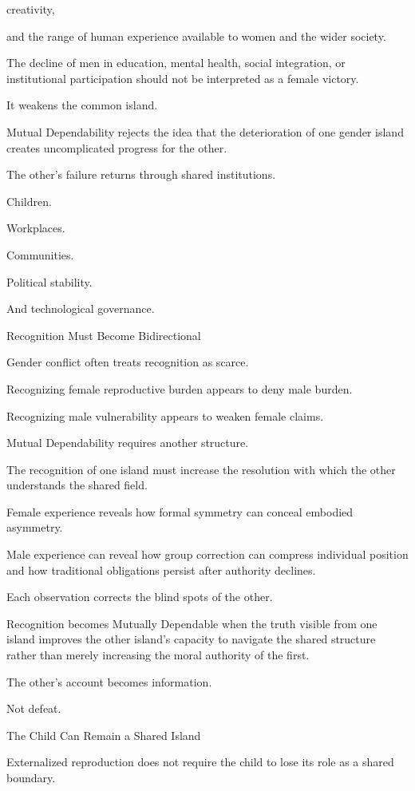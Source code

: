 creativity,

and the range of human experience available to women and the wider society.

The decline of men in education, mental health, social integration, or institutional participation should not be interpreted as a female victory.

It weakens the common island.

Mutual Dependability rejects the idea that the deterioration of one gender island creates uncomplicated progress for the other.

The other’s failure returns through shared institutions.

Children.

Workplaces.

Communities.

Political stability.

And technological governance.

Recognition Must Become Bidirectional

Gender conflict often treats recognition as scarce.

Recognizing female reproductive burden appears to deny male burden.

Recognizing male vulnerability appears to weaken female claims.

Mutual Dependability requires another structure.

The recognition of one island must increase the resolution with which the other understands the shared field.

Female experience reveals how formal symmetry can conceal embodied asymmetry.

Male experience can reveal how group correction can compress individual position and how traditional obligations persist after authority declines.

Each observation corrects the blind spots of the other.

Recognition becomes Mutually Dependable when the truth visible from one island improves the other island’s capacity to navigate the shared structure rather than merely increasing the moral authority of the first.

The other’s account becomes information.

Not defeat.

The Child Can Remain a Shared Island

Externalized reproduction does not require the child to lose its role as a shared boundary.

